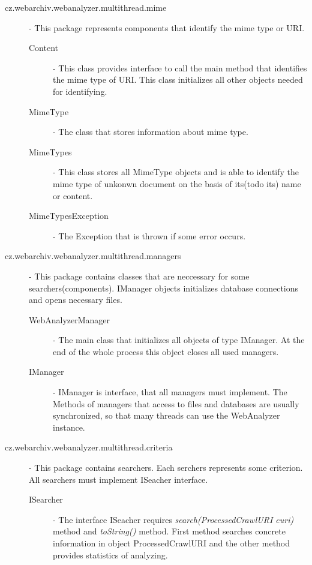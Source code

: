 \documentclass[11pt,a4paper]{article}
\begin{document}
\begin{description}
\item[cz.webarchiv.webanalyzer.multithread.mime] - This package represents components that identify the mime type or URI.
\begin{description}
\item[Content] - This class provides interface to call the main method that identifies the mime type of URI. This class initializes all other objects needed for identifying.
\item[MimeType] - The class that stores information about mime type.
\item[MimeTypes] - This class stores all MimeType objects and is able to identify the mime type of unkonwn document on the basis of its(todo its) name or content.
\item[MimeTypesException] - The Exception that is thrown if some error occurs.
\end{description}

\item[cz.webarchiv.webanalyzer.multithread.managers] - This package contains classes that are neccessary for some searchers(components). I\-Ma\-na\-ger objects initializes database connections and opens necessary files.
\begin{description}
\item[WebAnalyzerManager] - The main class that initializes all objects of type IManager. At the end of the whole process this object closes all used managers.
\item[IManager] - IManager is interface, that all managers must implement. The Methods of managers that access to files and databases are usually synchronized, so that many threads can use the Web\-A\-na\-lyzer instance.
\end{description}

\item[cz.webarchiv.webanalyzer.multithread.criteria] - This package contains searchers. Each serchers represents some criterion. All searchers must implement ISeacher interface.
\begin{description}
\item[ISearcher] - The interface ISeacher requires \emph{search(ProcessedCrawlURI curi)} method and \emph{toString()} method. First method searches concrete information in object ProcessedCrawlURI and the other method provides statistics of analyzing.
\end{description}

\end{description}
\end{document}
